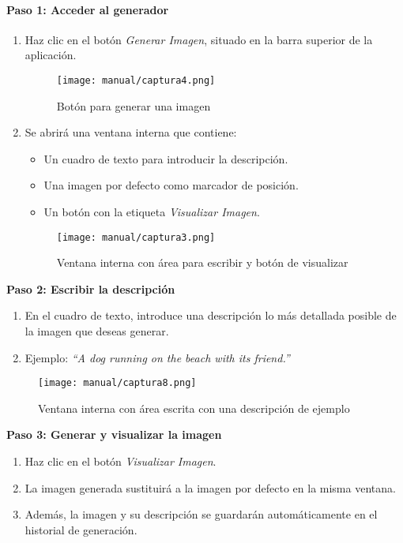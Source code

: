 \paragraph{\textbf{Paso 1: Acceder al generador}}
\begin{enumerate}
    \item Haz clic en el botón \textit{Generar Imagen}, situado en la barra superior de la aplicación.
    \begin{figure}[H]
        \centering
        \texttt{[image: manual/captura4.png]}
        \caption{Botón para generar una imagen}
    \end{figure}

    \item Se abrirá una ventana interna que contiene:
    \begin{itemize}
        \item Un cuadro de texto para introducir la descripción.
        \item Una imagen por defecto como marcador de posición.
        \item Un botón con la etiqueta \textit{Visualizar Imagen}.
    \end{itemize}
    
    \begin{figure}[H]
        \centering
        \texttt{[image: manual/captura3.png]}
        \caption{Ventana interna con área para escribir y botón de visualizar}
    \end{figure}
\end{enumerate}

\textbf{Paso 2: Escribir la descripción}
\begin{enumerate}
    \item En el cuadro de texto, introduce una descripción lo más detallada posible de la imagen que deseas generar.
    \item Ejemplo: \textit{``A dog running on the beach with its friend.''}
\end{enumerate}

    \begin{figure}[H]
        \centering
        \texttt{[image: manual/captura8.png]}
        \caption{Ventana interna con área escrita con una descripción de ejemplo}
    \end{figure}

\textbf{Paso 3: Generar y visualizar la imagen}
\begin{enumerate}
    \item Haz clic en el botón \textit{Visualizar Imagen}.
    \item La imagen generada sustituirá a la imagen por defecto en la misma ventana.
    \item Además, la imagen y su descripción se guardarán automáticamente en el historial de generación.
\end{enumerate}

